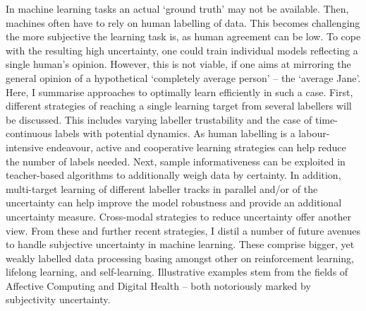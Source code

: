 
In machine learning tasks an actual `ground truth' may not be available. Then, machines often have to rely on human labelling of data. This becomes challenging the more subjective the learning task is, as human agreement can be low. To cope with the resulting high uncertainty, one could train individual models reflecting a single human's opinion. However, this is not viable, if one aims at mirroring the general opinion of a hypothetical `completely average person' -- the `average Jane'. Here, I summarise approaches to optimally learn efficiently in such a case. First, different strategies of reaching a single learning target from several labellers will be discussed. This includes varying labeller trustability and the case of time-continuous labels with potential dynamics. As human labelling is a labour-intensive endeavour, active and cooperative learning strategies can help reduce the number of labels needed. Next, sample informativeness can be exploited in teacher-based algorithms to additionally weigh data by certainty. In addition, multi-target learning of different labeller tracks in parallel and/or of the uncertainty can help improve the model robustness and provide an additional uncertainty measure. Cross-modal strategies to reduce uncertainty offer another view. From these and further recent strategies, I distil a number of future avenues to handle subjective uncertainty in machine learning. These comprise bigger, yet weakly labelled data processing basing amongst other on reinforcement learning, lifelong learning, and self-learning. Illustrative examples stem from the fields of Affective Computing and Digital Health -- both notoriously marked by subjectivity uncertainty.


